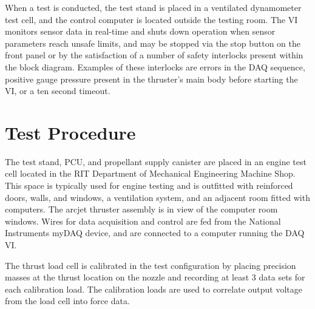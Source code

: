 \documentclass[journal]{IEEEtran}
\begin{document}
When a test is conducted, the test stand is placed in a ventilated dynamometer test cell, and the control computer is located outside the testing room.
The VI monitors sensor data in real-time and shuts down operation when sensor parameters reach unsafe limits, and may be stopped via the stop button on the front panel or by the satisfaction of a number of safety interlocks present within the block diagram.
Examples of these interlocks are errors in the DAQ sequence, positive gauge pressure present in the thruster's main body before starting the VI, or a ten second timeout.


\section{Test Procedure}
The test stand, PCU, and propellant supply canister are placed in an engine test cell located in the RIT Department of Mechanical Engineering Machine Shop.
This space is typically used for engine testing and is outfitted with reinforced doors, walls, and windows, a ventilation system, and an adjacent room fitted with computers.
The arcjet thruster assembly is in view of the computer room windows.
Wires for data acquisition and control are fed from the National Instruments myDAQ device, and are connected to a computer running the DAQ VI.\@

The thrust load cell is calibrated in the test configuration by placing precision masses at the thrust location on the nozzle and recording at least 3 data sets for each calibration load.
The calibration loads are used to correlate output voltage from the load cell into force data.

\end{document}
